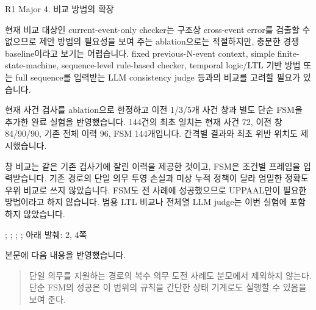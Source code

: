 \clearpage

\begin{reviewitem}{R1 Major 4. 비교 방법의 확장}

\begin{reviewercomment}

현재 비교 대상인 current-event-only checker는 구조상 cross-event error를 검출할 수 없으므로 제안 방법의 필요성을 보여 주는 ablation으로는 적절하지만, 충분한 경쟁 baseline이라고 보기는 어렵습니다. fixed previous-N-event context, simple finite-state-machine, sequence-level rule-based checker, temporal logic/LTL 기반 방법 또는 full sequence를 입력받는 LLM consistency judge 등과의 비교를 고려할 필요가 있습니다.

\end{reviewercomment}

\begin{authorresponse}

현재 사건 검사를 ablation으로 한정하고 이전 1/3/5개 사건 창과 별도 단순 FSM을 추가한 완료 실험을 반영했습니다. 144건의 최초 일치는 현재 사건 72, 이전 창 84/90/90, 기존 전체 이력 96, FSM 144개입니다. 간격별 결과와 최초 위반 위치도 제시했습니다.

창 비교는 같은 기존 검사기에 잘린 이력을 제공한 것이고, FSM은 조건별 프레임을 입력받습니다. 기존 경로의 단일 의무 투영 손실과 미상 누적 정책이 달라 엄밀한 정확도 우위 비교로 쓰지 않았습니다. FSM도 전 사례에 성공했으므로 UPPAAL만이 필요한 방법이라고 하지 않습니다. 범용 LTL 비교나 전체열 LLM judge는 이번 실험에 포함하지 않았습니다.

\end{authorresponse}

\begin{manuscriptrevision}{; ; ; ; 아래 발췌: 2, 4쪽}

본문에 다음 내용을 반영했습니다.

\begin{quote}

단일 의무를 지원하는 경로의 복수 의무 도전 사례도 분모에서 제외하지 않는다. 단순 FSM의 성공은 이 범위의 규칙을 간단한 상태 기계로도 실행할 수 있음을 보여 준다.

\end{quote}

\end{manuscriptrevision}

\end{reviewitem}

